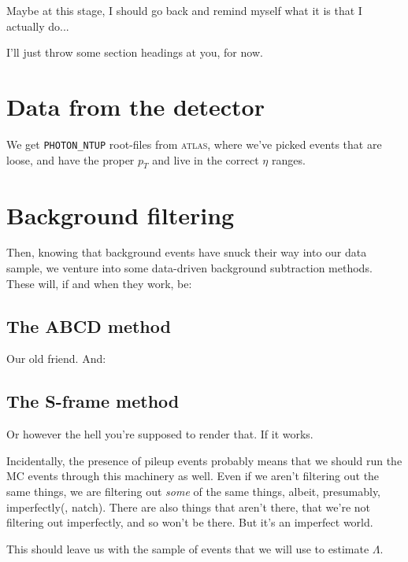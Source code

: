 Maybe at this stage, I should go back and remind myself what it is that I actually do...

I'll just throw some section headings at you, for now.

\section{Data from the detector}
We get \texttt{PHOTON\_NTUP} root-files from \textsc{atlas}, where we've picked events that are loose, and have the proper $p_T$ and live in the correct $\eta$ ranges.

\section{Background filtering}
Then, knowing that background events have snuck their way into our data sample, we venture into some data-driven background subtraction methods. These will, if and when they work, be:

\subsection{The ABCD method}
Our old friend. And:

\subsection{The S-frame method}
Or however the hell you're supposed to render that. If it works.

Incidentally, the presence of pileup events probably means that we should run the MC events through this machinery as well. Even if we aren't filtering out the same things, we are filtering out \textit{some} of the same things, albeit, presumably, imperfectly(, natch). There are also things that aren't there, that we're not filtering out imperfectly, and so won't be there. But it's an imperfect world.

This should leave us with the sample of events that we will use to estimate $\Lambda$.
